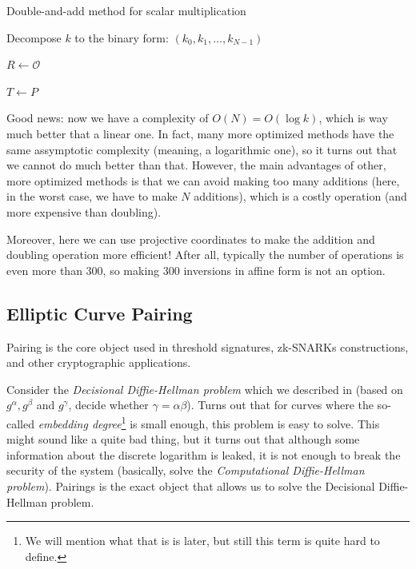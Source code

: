\documentclass[../lecture-notes.tex]{subfiles}
\begin{document}
\begin{algorithm}
    \caption{Double-and-add method for scalar multiplication}\label{alg:double_and_add}
    
    Decompose $k$ to the binary form: $(k_0,k_1,\dots,k_{N-1})$
    
    $R \gets \mathcal{O}$
    
    $T \gets P$
    
    
\end{algorithm}    

Good news: now we have a complexity of $O(N)=O(\log k)$, which is way much better that a linear one. In fact, many more optimized methods have the same assymptotic complexity (meaning, a logarithmic one), so it turns out that 
we cannot do much better than that. However, the main advantages of other, more optimized methods is that we can avoid making too many additions (here, in the worst case, we have to make $N$ additions), which is a costly operation (and more expensive than doubling).

Moreover, here we can use projective coordinates to make the addition and doubling operation more efficient! After all, typically the number of operations is even more than $300$, so making $300$ inversions in affine form is not an option.

\subsection{Elliptic Curve Pairing}\label{section:ecpairing}

Pairing is the core object used in threshold signatures, zk-SNARKs constructions, and other cryptographic applications. 

Consider the \textit{Decisional Diffie-Hellman problem} which we described in  (based on $g^{\alpha},g^{\beta}$ and $g^{\gamma}$, decide whether $\gamma = \alpha\beta$). Turns out that for curves where the so-called \textit{embedding degree}\footnote{We will mention what that is is later, but still this term is quite hard to define.} is small enough, this problem is easy to solve. This might sound 
like a quite bad thing, but it turns out that although some information about the discrete logarithm is leaked, it is not enough to break the security of the system (basically, solve the \textit{Computational Diffie-Hellman problem}). 
Pairings is the exact object that allows us to solve the Decisional Diffie-Hellman problem.
\end{document}
